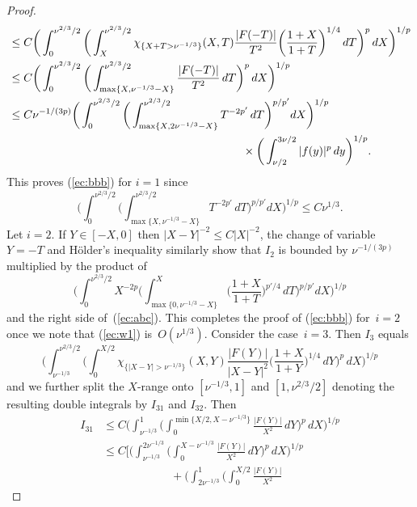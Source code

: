 \documentclass[leqno,a4paper]{amsart}
\begin{document}
\begin{proof}
\begin{align*}
&\le C\bigg(\int_{0}^{\nu^{2/3}/2}\bigg(\int_{X}^{\nu^{2/3}/2}
\chi_{\{X+T>\nu^{-1/3}\}}(X,T)\frac{|F(-T)|}{T^{2}}
\bigg(\frac{1+X}{1+T}\bigg)^{1/4}\,dT\bigg)^p\,dX\bigg)^{1/p}\\
&\le C\bigg(\int_{0}^{\nu^{2/3}/2}\bigg(\int_{\max\{X,\nu^{-1/3}-X\}}
^{\nu^{2/3}/2} \frac{|F(-T)|}{T^{2}}\,dT\bigg)^p\,dX\bigg)^{1/p}\\
&\le C\nu^{-1/(3p)}\bigg(\int_{0}^{\nu^{2/3}/2} \bigg(\int_{\max\{X,2\nu^
{-1/3}-X\}}^{\nu^{2/3}/2}T^{-2p'}\,dT\bigg)^{p/p'}dX\bigg)^{1/p} \\
&\hspace{0.6\textwidth} \times
\bigg(\int_{\nu/2}^{3\nu/2}|f(y)|^p\,dy\bigg)^{1/p}.
\end{align*}
This proves (\ref{ec:bbb}) for $i=1$ since
\begin{equation*}
\bigg(\int_{0}^{\nu^{2/3}/2}\bigg(\int_{\max\{X,\nu^{-1/3}-X\}}^
{\nu^{2/3}/2}T^{-2p'}\,dT\bigg)^{p/p'}dX\bigg)^{1/p}\le C\nu^{1/3}.
\end{equation*}
Let $i=2$. If $Y\in [-X,0]$ then $|X-Y|^{-2}\le C|X|^{-2}$, the change of
variable $Y=-T$ and H\"older's inequality similarly show that $I_2$ is bounded
by $\nu^{-1/(3p)}$ multiplied by the product of
\begin{equation}
\label{ec:w1}
\bigg(\int_{0}^{\nu^{2/3}/2}X^{-2p}\bigg(\int_{\max\{0,
\nu^{-1/3}-X\}}^{X}\bigg(\frac{1+X}{1+T}\bigg)^{p'/4}\,dT\bigg)^{p/p'}
dX\bigg)^{1/p}
\end{equation}
and the right side of~(\ref{ec:abc}). This completes the proof of
(\ref{ec:bbb}) for~$i=2$ once we note that (\ref{ec:w1}) is~$O(\nu^{1/3})$.
Consider the case~$i=3$. Then $I_3$ equals
\begin{equation*}
\bigg(\int_{\nu^{-1/3}}^{\nu^{2/3}/2}\bigg(\int_{0}^{X/2}
\chi_{\{|X-Y|>\nu^{-1/3}\}}(X,Y)\frac{|F(Y)|}{|X-Y|^2}
\bigg(\frac{1+X}{1+Y}\bigg)^{1/4}\,dY\bigg)^p\,dX\bigg)^{1/p}
\end{equation*}
and we further split the $X$-range onto $[\nu^{-1/3},1]$ and $[1,\nu^{2/3}/2]$
denoting the resulting double integrals by $I_{31}$ and $I_{32}$. Then
\begin{align*}
I_{31}
&\le C\bigg(\int_{\nu^{-1/3}}^{1}\bigg(\int_{0}^{\min\{X/2,X-\nu^{-1/3}\}}
\frac{|F(Y)|}{X^{2}}\,dY\bigg)^p\,dX\bigg)^{1/p}\\
&\le C\bigg[\bigg(\int_{\nu^{-1/3}}^{2\nu^{-1/3}}\bigg(\int_{0}^{X-\nu^{-1/3}}
\frac{|F(Y)|}{X^{2}}\,dY\bigg)^p\,dX\bigg)^{1/p}\\
&\qquad \qquad \qquad
+\bigg(\int_{2\nu^{-1/3}}^{1}\bigg(\int_{0}^{X/2}\frac{|F(Y)|}{X^{2}}

\end{align*}
\end{proof}
\end{document}
